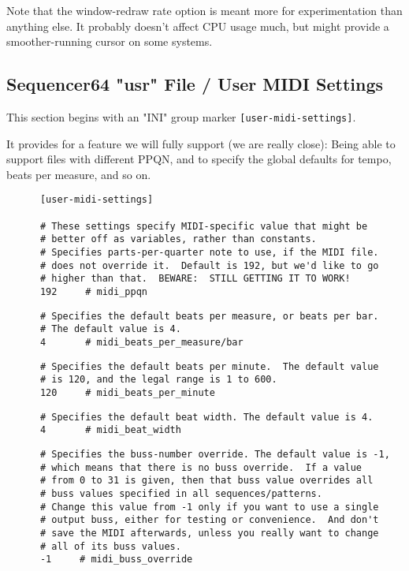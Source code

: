    Note that the window-redraw rate option is meant more for experimentation
   than anything else.  It probably doesn't affect CPU usage much, but might
   provide a smoother-running cursor on some systems.

\subsection{Sequencer64 "usr" File / User MIDI Settings}
\label{subsec:seq64_usr_file_user_midi_settings}

   This section begins with an
   "INI" group marker \texttt{[user-midi-settings]}.

   It provides for a feature we will fully support (we are really close):
   Being able to support files with different PPQN, and to specify the
   global defaults for tempo, beats per measure, and so on.

   \begin{verbatim}
      [user-midi-settings]

      # These settings specify MIDI-specific value that might be
      # better off as variables, rather than constants.
      # Specifies parts-per-quarter note to use, if the MIDI file.
      # does not override it.  Default is 192, but we'd like to go
      # higher than that.  BEWARE:  STILL GETTING IT TO WORK!
      192     # midi_ppqn
   \end{verbatim}

   \begin{verbatim}
      # Specifies the default beats per measure, or beats per bar.
      # The default value is 4.
      4       # midi_beats_per_measure/bar
   \end{verbatim}

   \begin{verbatim}
      # Specifies the default beats per minute.  The default value
      # is 120, and the legal range is 1 to 600.
      120     # midi_beats_per_minute
   \end{verbatim}

   \begin{verbatim}
      # Specifies the default beat width. The default value is 4.
      4       # midi_beat_width
   \end{verbatim}

   \begin{verbatim}
      # Specifies the buss-number override. The default value is -1,
      # which means that there is no buss override.  If a value
      # from 0 to 31 is given, then that buss value overrides all
      # buss values specified in all sequences/patterns.
      # Change this value from -1 only if you want to use a single
      # output buss, either for testing or convenience.  And don't
      # save the MIDI afterwards, unless you really want to change
      # all of its buss values.
      -1     # midi_buss_override
   \end{verbatim}

